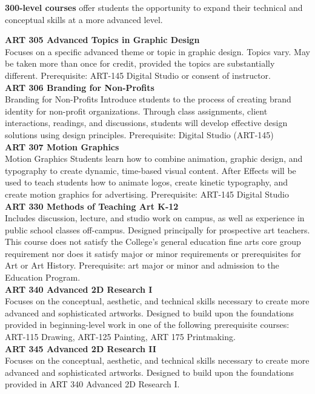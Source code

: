\documentclass[
  letterpaper,
]{scrbook}
\begin{document}
\textbf{300-level courses} offer students the opportunity to expand
their technical and conceptual skills at a more advanced level.

\textbf{ART 305 Advanced Topics in Graphic Design}\\
Focuses on a specific advanced theme or topic in graphic design. Topics
vary. May be taken more than once for credit, provided the topics are
substantially different. Prerequisite: ART-145 Digital Studio or consent
of instructor.\\
\textbf{ART 306 Branding for Non-Profits}\\
Branding for Non-Profits Introduce students to the process of creating
brand identity for non-profit organizations. Through class assignments,
client interactions, readings, and discussions, students will develop
effective design solutions using design principles. Prerequisite:
Digital Studio (ART-145)\\
\textbf{ART 307 Motion Graphics}\\
Motion Graphics Students learn how to combine animation, graphic design,
and typography to create dynamic, time-based visual content. After
Effects will be used to teach students how to animate logos, create
kinetic typography, and create motion graphics for advertising.
Prerequisite: ART-145 Digital Studio\\
\textbf{ART 330 Methods of Teaching Art K-12}\\
Includes discussion, lecture, and studio work on campus, as well as
experience in public school classes off-campus. Designed principally for
prospective art teachers. This course does not satisfy the College's
general education fine arts core group requirement nor does it satisfy
major or minor requirements or prerequisites for Art or Art History.
Prerequisite: art major or minor and admission to the Education
Program.\\
\textbf{ART 340 Advanced 2D Research I}\\
Focuses on the conceptual, aesthetic, and technical skills necessary to
create more advanced and sophisticated artworks. Designed to build upon
the foundations provided in beginning-level work in one of the following
prerequisite courses: ART-115 Drawing, ART-125 Painting, ART 175
Printmaking.\\
\textbf{ART 345 Advanced 2D Research II}\\
Focuses on the conceptual, aesthetic, and technical skills necessary to
create more advanced and sophisticated artworks. Designed to build upon
the foundations provided in ART 340 Advanced 2D Research I.
\end{document}
